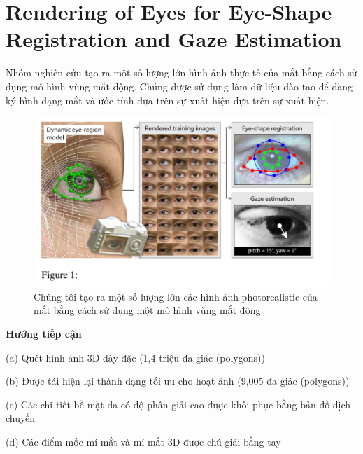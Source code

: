 \section{Rendering of Eyes for Eye-Shape Registration and Gaze Estimation
\cite{eyeShapeRegistrationAndGazeEstimation}}
Nhóm nghiên cứu tạo ra một số lượng lớn hình ảnh thực tế của mắt bằng cách sử dụng mô hình vùng mắt động. Chúng được sử dụng làm dữ liệu đào tạo để đăng ký hình dạng mắt và ước tính dựa trên sự xuất hiện dựa trên sự xuất hiện.
\begin{center}
    \begin{figure}[h!]
    \begin{center}
     \includegraphics[scale=1]{img/photorealistic_images_of_eyes.png}
    \end{center}
    \caption{Chúng tôi tạo ra một số lượng lớn các hình ảnh photorealistic của mắt bằng cách sử dụng một mô hình vùng mắt động.}
    \label{refhinh20}
    \end{figure}
\end{center}
\textbf{Hướng tiếp cận}

(a) Quét hình ảnh 3D dày đặc (1,4 triệu đa giác (polygons))

(b) Được tái hiện lại thành dạng tối ưu cho hoạt ảnh (9,005 đa giác (polygons))

(c) Các chi tiết bề mặt da có độ phân giải cao được khôi phục bằng bản đồ dịch chuyển 

(d) Các điểm mốc mí mắt và mí mắt 3D được chú giải bằng tay 

